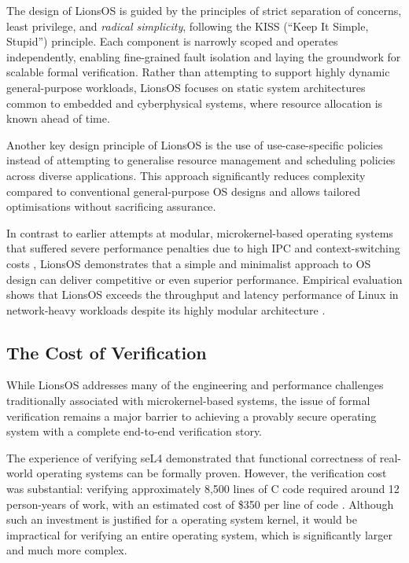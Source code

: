 The design of LionsOS is guided by the principles of strict separation of concerns, least privilege, and \emph{radical simplicity}, following the KISS (``Keep It Simple, Stupid'') principle. Each component is narrowly scoped and operates independently, enabling fine-grained fault isolation and laying the groundwork for scalable formal verification. Rather than attempting to support highly dynamic general-purpose workloads, LionsOS focuses on static system architectures common to embedded and cyberphysical systems, where resource allocation is known ahead of time.

Another key design principle of LionsOS is the use of use-case-specific policies instead of attempting to generalise resource management and scheduling policies across diverse applications. This approach significantly reduces complexity compared to conventional general-purpose OS designs and allows tailored optimisations without sacrificing assurance.

In contrast to earlier attempts at modular, microkernel-based operating systems that suffered severe performance penalties due to high IPC and context-switching costs \citep{chen2024hongmeng}, LionsOS demonstrates that a simple and minimalist approach to OS design can deliver competitive or even superior performance. Empirical evaluation shows that LionsOS exceeds the throughput and latency performance of Linux in network-heavy workloads despite its highly modular architecture \citep{heiser2025lionsos}.


\subsection{The Cost of Verification} 
\label{subsec:verification-cost}

While LionsOS addresses many of the engineering and performance challenges traditionally associated with microkernel-based systems, the issue of formal verification remains a major barrier to achieving a provably secure operating system with a complete end-to-end verification story.

The experience of verifying seL4 demonstrated that functional correctness of real-world operating systems can be formally proven. However, the verification cost was substantial: verifying approximately 8,500 lines of C code required around 12 person-years of work, with an estimated cost of \$350 per line of code \citep{klein2009seL4}. Although such an investment is justified for a operating system kernel, it would be impractical for verifying an entire operating system, which is significantly larger and much more complex.

